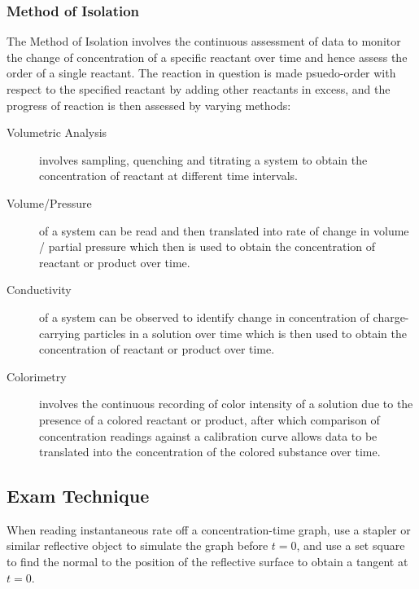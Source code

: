 \documentclass[../main]{subfiles}
\begin{document}
	\subsubsection{Method of Isolation}

	The Method of Isolation involves the continuous assessment of data to monitor the change of concentration of a specific reactant over time and hence assess the order of a single reactant. The reaction in question is made psuedo-order with respect to the specified reactant by adding other reactants in excess, and the progress of reaction is then assessed by varying methods:

	\begin{description}
		\item[Volumetric Analysis] involves sampling, quenching and titrating a system to obtain the concentration of reactant at different time intervals.
		\item[Volume/Pressure] of a system can be read and then translated into rate of change in volume / partial pressure which then is used to obtain the concentration of reactant or product over time.
		\item[Conductivity] of a system can be observed to identify change in concentration of charge-carrying particles in a solution over time which is then used to obtain the concentration of reactant or product over time. 
		\item[Colorimetry] involves the continuous recording of color intensity of a solution due to the presence of a colored reactant or product, after which comparison of concentration readings against a calibration curve allows data to be translated into the concentration of the colored substance over time.
	\end{description}

	\subsection{Exam Technique}

	When reading instantaneous rate off a concentration-time graph, use a stapler or similar reflective object to simulate the graph before \(t=0\), and use a set square to find the normal to the position of the reflective surface to obtain a tangent at \(t=0\). \\
\end{document}
